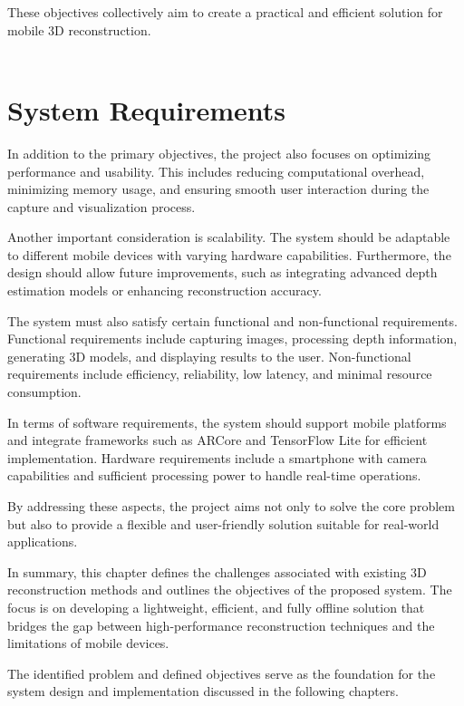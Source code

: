 These objectives collectively aim to create a practical and efficient solution for mobile 3D reconstruction. \\ \\

\section{System Requirements}

In addition to the primary objectives, the project also focuses on optimizing performance and usability. This includes reducing computational overhead, minimizing memory usage, and ensuring smooth user interaction during the capture and visualization process.

Another important consideration is scalability. The system should be adaptable to different mobile devices with varying hardware capabilities. Furthermore, the design should allow future improvements, such as integrating advanced depth estimation models or enhancing reconstruction accuracy.

The system must also satisfy certain functional and non-functional requirements. Functional requirements include capturing images, processing depth information, generating 3D models, and displaying results to the user. Non-functional requirements include efficiency, reliability, low latency, and minimal resource consumption.

In terms of software requirements, the system should support mobile platforms and integrate frameworks such as ARCore and TensorFlow Lite for efficient implementation. Hardware requirements include a smartphone with camera capabilities and sufficient processing power to handle real-time operations.

By addressing these aspects, the project aims not only to solve the core problem but also to provide a flexible and user-friendly solution suitable for real-world applications.

In summary, this chapter defines the challenges associated with existing 3D reconstruction methods and outlines the objectives of the proposed system. The focus is on developing a lightweight, efficient, and fully offline solution that bridges the gap between high-performance reconstruction techniques and the limitations of mobile devices.

The identified problem and defined objectives serve as the foundation for the system design and implementation discussed in the following chapters.